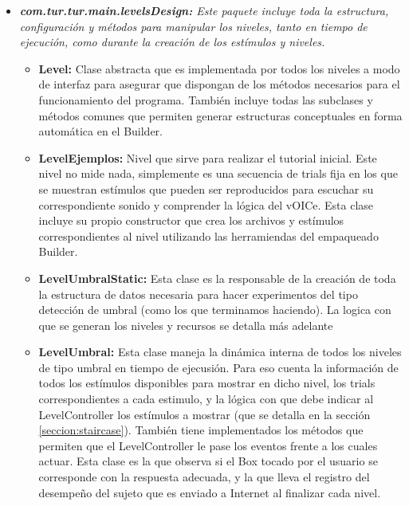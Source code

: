 \documentclass{article}
\numberwithin{figure}{section}
\begin{document}
\begin{itemize}
        \item \textit{\textbf{com.tur.tur.main.levelsDesign:} Este paquete incluye toda la estructura, configuración y métodos para manipular los niveles, tanto en tiempo de ejecución, como durante la creación de los estímulos y niveles.}
        \begin{itemize}
            \item \textbf{Level:} Clase abstracta que es implementada por todos los niveles a modo de interfaz para asegurar que dispongan de los métodos necesarios para el funcionamiento del programa. También incluye todas las subclases y métodos comunes que permiten generar estructuras conceptuales en forma automática en el Builder. 
            \item \textbf{LevelEjemplos:} Nivel que sirve para realizar el tutorial inicial. Este nivel no mide nada, simplemente es una secuencia de trials fija en los que se muestran estímulos que pueden ser reproducidos para escuchar su correspondiente sonido y comprender la lógica del vOICe. Esta clase incluye su propio constructor que crea los archivos y estímulos correspondientes al nivel utilizando las herramiendas del empaqueado Builder. 
            \item \textbf{LevelUmbralStatic:} Esta clase es la responsable de la creación de toda la estructura de datos necesaria para hacer experimentos del tipo detección de umbral (como los que terminamos haciendo). La logica con que se generan los niveles y recursos se detalla más adelante
            \item \textbf{LevelUmbral:} Esta clase maneja la dinámica interna de todos los niveles de tipo umbral en tiempo de ejecusión. Para eso cuenta la información de todos los estímulos disponibles para mostrar en dicho nivel, los trials correspondientes a cada estimulo, y la lógica con que debe indicar al LevelController los estímulos a mostrar (que se detalla en la sección \ref{seccion:staircase}). También tiene implementados los métodos que permiten que el LevelController le pase los eventos frente a los cuales actuar. Esta clase es la que observa si el Box tocado por el usuario se corresponde con la respuesta adecuada, y la que lleva el registro del desempeño del sujeto que es enviado a Internet al finalizar cada nivel. 
        \end{itemize}
        

\end{itemize}
\end{document}
